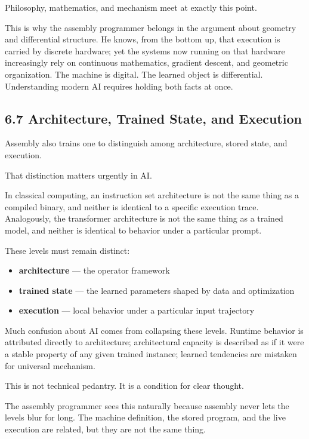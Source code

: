 \documentclass[
]{article}
\providecommand{\tightlist}{%
  \setlength{\itemsep}{0pt}\setlength{\parskip}{0pt}}
\begin{document}
Philosophy, mathematics, and mechanism meet at exactly this point.

This is why the assembly programmer belongs in the argument about
geometry and differential structure. He knows, from the bottom up, that
execution is carried by discrete hardware; yet the systems now running
on that hardware increasingly rely on continuous mathematics, gradient
descent, and geometric organization. The machine is digital. The learned
object is differential. Understanding modern AI requires holding both
facts at once.

\hypertarget{architecture-trained-state-and-execution}{%
\subsection{6.7 Architecture, Trained State, and
Execution}\label{architecture-trained-state-and-execution}}

Assembly also trains one to distinguish among architecture, stored
state, and execution.

That distinction matters urgently in AI.

In classical computing, an instruction set architecture is not the same
thing as a compiled binary, and neither is identical to a specific
execution trace. Analogously, the transformer architecture is not the
same thing as a trained model, and neither is identical to behavior
under a particular prompt.

These levels must remain distinct:

\begin{itemize}
\tightlist
\item
  \textbf{architecture} --- the operator framework
\item
  \textbf{trained state} --- the learned parameters shaped by data and
  optimization
\item
  \textbf{execution} --- local behavior under a particular input
  trajectory
\end{itemize}

Much confusion about AI comes from collapsing these levels. Runtime
behavior is attributed directly to architecture; architectural capacity
is described as if it were a stable property of any given trained
instance; learned tendencies are mistaken for universal mechanism.

This is not technical pedantry. It is a condition for clear thought.

The assembly programmer sees this naturally because assembly never lets
the levels blur for long. The machine definition, the stored program,
and the live execution are related, but they are not the same thing.
\end{document}
